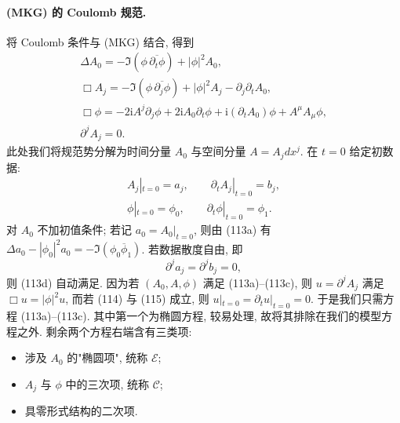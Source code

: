 \paragraph*{(MKG) 的 Coulomb 规范.} 将 Coulomb 条件与 (MKG) 结合, 得到
\begin{gather}
\Delta A_0=-\Im(\phi\,\overline{\partial_t\phi})+|\phi|^2A_0,\\
\Box A_j=-\Im(\phi\,\overline{\partial_j\phi})+|\phi|^2A_j-\partial_j\partial_t A_0,\\
\Box\phi=-2\mathrm{i}A^j\partial_j\phi+2\mathrm{i}A_0\partial_t\phi+\mathrm{i}(\partial_t A_0)\phi+A^\mu A_\mu\phi,\\
\partial^j A_j=0.\end{gather}
此处我们将规范势分解为时间分量 $A_0$ 与空间分量 $A=A_j dx^j$. 在 $t=0$ 给定初数据:
\begin{gather}
A_j|_{t=0}=a_j,\qquad \partial_t A_j|_{t=0}=b_j,\\
\phi|_{t=0}=\phi_0,\qquad \partial_t\phi|_{t=0}=\phi_1.\end{gather}
对 $A_0$ 不加初值条件; 若记 $a_0=A_0|_{t=0}$, 则由 (113a) 有 $\Delta a_0-|\phi_0|^2a_0=-\Im(\phi_0\overline{\phi}_1)$.
若数据散度自由, 即
\begin{equation}
\partial^j a_j=\partial^j b_j=0,\end{equation}
则 (113d) 自动满足. 因为若 $(A_0,A,\phi)$ 满足 (113a)--(113c), 则 $u=\partial^j A_j$ 满足 $\Box u=|\phi|^2u$, 而若 (114) 与 (115) 成立, 则 $u|_{t=0}=\partial_t u|_{t=0}=0$.
于是我们只需方程 (113a)--(113c). 其中第一个为椭圆方程, 较易处理, 故将其排除在我们的模型方程之外. 剩余两个方程右端含有三类项:
\begin{itemize}
\item 涉及 $A_0$ 的"椭圆项", 统称 $\mathcal{E}$;
\item $A_j$ 与 $\phi$ 中的三次项, 统称 $\mathcal{C}$;
\item 具零形式结构的二次项.\end{itemize}

